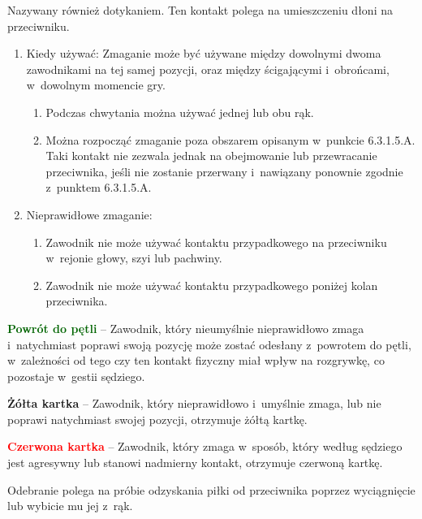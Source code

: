 \documentclass[12pt,a4paper]{article}
\renewcommand{\paragraph}[1]{
  \oldparagraph{#1}%
  \leftskip2cm
}
\newcommand\redcard[1]{\bgroup\textcolor{red}{\textbf{#1}}}
\newcommand\yellowcard[1]{\bgroup\textcolor{darkyellow}{\textbf{#1}}}
\newcommand\other[1]{\bgroup\textcolor{darkgreen}{\textbf{#1}}}
\begin{document}
\paragraph{Zmaganie}
Nazywany również dotykaniem. Ten kontakt
polega na umieszczeniu dłoni na przeciwniku.

\begin{enumerate}
	\item
	      Kiedy używać: Zmaganie może być używane między dowolnymi dwoma
	      zawodnikami na tej samej pozycji, oraz między ścigającymi i~obrońcami,
	      w~dowolnym momencie gry.

	      \begin{enumerate}
		      \item
		            Podczas chwytania można używać jednej lub obu rąk.
		      \item
		            Można rozpocząć zmaganie poza obszarem opisanym w~punkcie
		            6.3.1.5.A. Taki kontakt nie zezwala jednak na obejmowanie lub
		            przewracanie przeciwnika, jeśli nie zostanie przerwany i~nawiązany
		            ponownie zgodnie z~punktem 6.3.1.5.A.
	      \end{enumerate}
	\item
	      Nieprawidłowe zmaganie:

	      \begin{enumerate}
		      \item
		            Zawodnik nie może używać kontaktu przypadkowego na przeciwniku w~rejonie głowy, szyi lub pachwiny.
		      \item
		            Zawodnik nie może używać kontaktu przypadkowego poniżej kolan
		            przeciwnika.
	      \end{enumerate}
\end{enumerate}

\other{Powrót do pętli} -- Zawodnik, który nieumyślnie nieprawidłowo
zmaga i~natychmiast poprawi swoją pozycję może zostać odesłany z~powrotem do pętli, w~zależności od tego czy ten kontakt fizyczny miał
wpływ na rozgrywkę, co pozostaje w~gestii sędziego.

\yellowcard{Żółta kartka} -- Zawodnik, który nieprawidłowo i~umyślnie zmaga,
lub nie poprawi natychmiast swojej pozycji, otrzymuje żółtą kartkę.

\redcard{Czerwona kartka} -- Zawodnik, który zmaga w~sposób, który według
sędziego jest agresywny lub stanowi nadmierny kontakt, otrzymuje
czerwoną kartkę.

\paragraph{Odbieranie}
Odebranie polega na próbie odzyskania
piłki od przeciwnika poprzez wyciągnięcie lub wybicie mu jej z~rąk.
\end{document}
